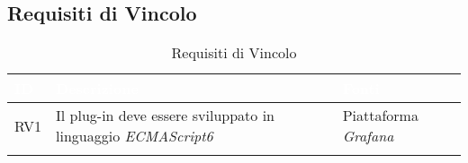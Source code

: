 \subsection{Requisiti di Vincolo}\label{RV}
\begin{center}
\begin{longtable}[c]{|m{}|m{}|m{}|}
\hline
\rowcolor{bluelogo}\textbf{\textcolor{white}{ID}} & \textbf{\textcolor{white}{Descrizione}} & \textbf{\textcolor{white}{Fonti}}\\
\hline \hline
\endfirsthead
RV1 & Il plug-in deve essere sviluppato in linguaggio \textit{ECMAScript6} & Piattaforma \textit{Grafana}\\
\hline
\caption{Requisiti di Vincolo}
\end{longtable}
\end{center}
\pagebreak

